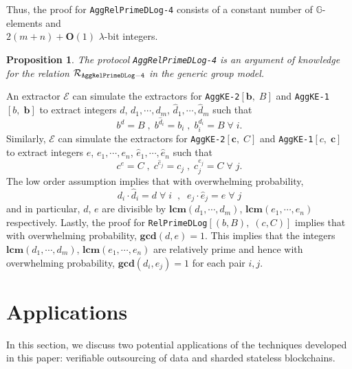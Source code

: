 \documentclass[11pt, lettersize, notitlepage, leqno, footskip=0.6cm]{article}
\newcommand{\mc}{\mathcal}
\newcommand{\mb}{\mathbb}
\newcommand{\mbf}{\mathbf}
\newcommand{\lam}{\lambda}
\newcommand{\what}{\widehat}
\newcommand{\bO}{\mbf{O}}
\newcommand{\vs}{\vspace{-0.15cm}}
\newcommand{\noin}{\noindent}
\newcommand{\op}{overwhelming probability}
\newcommand{\np}{negligible probability}
\newcommand{\LCM}{\mbf{lcm}}
\newcommand{\GCD}{\mbf{gcd}}
\newcommand{\E}{\mc{E}}
\newtheorem{Prop}[Thm]{Proposition}
\numberwithin{equation}{section}
\begin{document}
\noindent Thus, the proof for \verb|AggRelPrimeDLog-4| consists of a constant number of $\mb{G}$-elements and \\$2(m+n)+\bO(1)$ $\lam$-bit integers.


\begin{Prop} The protocol \verb|AggRelPrimeDLog-4| is an argument of knowledge for the relation $\mc{R}_{\tt{AggRelPrimeDLog-4}}$ in the generic group model.\end{Prop}

\begin{prf} An extractor $\E$ can simulate the extractors for \verb|AggKE-2|$[\mbf{b},\; B]$ and \verb|AggKE-1|$[b,\;\mbf{b}]$ to extract integers $d$, $d_1,\cdots,d_m$, $\what{d}_1,\cdots,\what{d}_m$ such that \vs $$b^d = B\;,\; b^{\what{d}_i}= b_i\;,\; b_i^{d_i}= B\;\forall\; i.$$ Similarly, $\E$ can simulate the extractors for \verb|AggKE-2|$[\mbf{c},\; C]$ and \verb|AggKE-1|$[c,\;\mbf{c}]$ to extract integers $e$, $e_1,\cdots,e_n$, $\what{e}_1,\cdots,\what{e}_n$ such that \vs $$c^e = C\;,\; c^{\what{e}_j}= c_j\;,\;c_j^{e_j}= C\;\forall\; j.$$ The low order assumption implies that with \op,\vs $$d_i\cdot\what{d}_i = d\;\forall\;i\;\;,\;\; e_j\cdot\what{e}_j = e\;\forall\;j$$ and in particular, $d$, $e$ are divisible by $\LCM(d_1,\cdots,d_m)$, $\LCM(e_1,\cdots,e_n)$ respectively. Lastly, the proof for \verb|RelPrimeDLog|$[(b,B),\;(c,C)]$ implies that with \op, $\GCD(d,e) = 1$. This implies that the integers $\LCM(d_1,\cdots,d_m)$, $\LCM(e_1,\cdots,e_n)$ are relatively prime and hence with \op, $\GCD(d_i,e_j) = 1$ for each pair $i,j$. \end{prf}




\section{\fontsize{12}{12}\selectfont Applications}

\noin In this section, we discuss two potential applications of the techniques developed in this paper: verifiable outsourcing of data and sharded stateless blockchains. \vs
\end{document}
